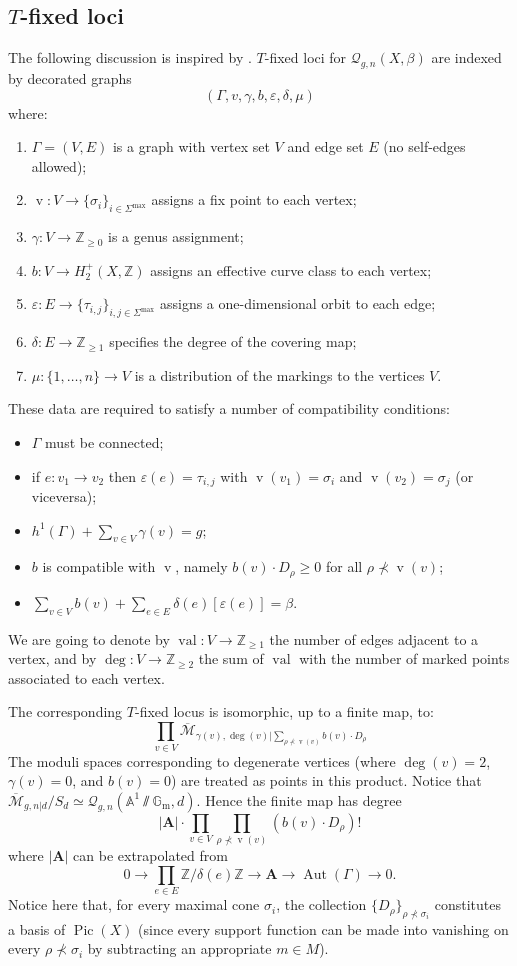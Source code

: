 \documentclass[11pt]{amsart}
\newcommand{\Q}[4]{\mathcal{Q}_{#1,#2}(#3,#4)}
\renewcommand{\to}{\rightarrow}
\newcommand{\Aaff}{\mathbb{A}}
\newcommand{\Pic}{\operatorname{Pic}}
\newcommand{\val}{\operatorname{val}}
\newcommand{\Gm}{\mathbb{G}_{\text{m}}}
\newcommand{\ZZ}{\mathbb{Z}}
\newcommand{\vv}{\operatorname{v}}
\newcommand{\Aut}{\operatorname{Aut}}
\theoremstyle{definition}
\theoremstyle{definition}
\begin{document}
\subsection{$T$-fixed loci}
The following discussion is inspired by \cite[\S 7.3]{MOP}. $T$-fixed loci for $\Q{g}{n}{X}{\beta}$ are indexed by decorated graphs
\[ \left(\Gamma, v, \gamma, b,\varepsilon,\delta,\mu\right) \]
where:
\begin{enumerate}
 \item $\Gamma=(V,E)$ is a graph with vertex set $V$ and edge set $E$ (no self-edges allowed);
 \item $\vv\colon V\to \{\sigma_i\}_{i\in\Sigma^\text{max}}$ assigns a fix point to each vertex;
 \item $\gamma\colon V\to \ZZ_{\geq 0}$ is a genus assignment;
 \item $b\colon V\to H^+_2(X,\ZZ)$ assigns an effective curve class to each vertex;
 \item $\varepsilon\colon E\to \{\tau_{i,j}\}_{i,j\in\Sigma^\text{max}}$ assigns a one-dimensional orbit to each edge;
 \item $\delta\colon E\to \ZZ_{\geq1}$ specifies the degree of the covering map;
 \item $\mu\colon \{1,\ldots,n\}\to V$ is a distribution of the markings to the vertices $V$.
\end{enumerate}
These data are required to satisfy a number of compatibility conditions:
\begin{itemize}
 \item $\Gamma$ must be connected;
 \item if $e\colon v_1\to v_2$ then $\varepsilon(e)=\tau_{i,j}$ with $\vv(v_1)=\sigma_i$ and $\vv(v_2)=\sigma_j$ (or viceversa);
 \item $h^1(\Gamma)+\sum_{v\in V} \gamma(v)=g$;
 \item $b$ is compatible with $\vv$, namely $b(v)\cdot D_\rho\geq 0$ for all $\rho\nprec \vv(v)$; 
 \item $\sum_{v\in V}b(v)+\sum_{e\in E}\delta(e)[\varepsilon(e)]=\beta$.
 \end{itemize}
We are going to denote by $\val\colon V\to\ZZ_{\geq1}$ the number of edges adjacent to a vertex, and by $\deg\colon V\to\ZZ_{\geq2}$ the sum of $\val$ with the number of marked points associated to each vertex.

The corresponding $T$-fixed locus is isomorphic, up to a finite map, to:
\[
 \prod_{v\in V} \overline{\mathcal M}_{\gamma(v),\deg(v)|\sum_{\rho\nprec \vv(v)}b(v)\cdot D_\rho}
\]
The moduli spaces corresponding to degenerate vertices (where $\deg(v)=2$, $\gamma(v)=0$, and $b(v)=0$) are treated as points in this product. Notice that $\overline{\mathcal M}_{g,n|d}/S_d\simeq\Q{g}{n}{\Aaff^1\sslash\Gm}{d}$. Hence the finite map has degree \[|\mathbf A|\cdot\prod_{v\in V}\prod_{\rho\nprec\vv(v)}(b(v)\cdot D_\rho)!\] where $|\mathbf A|$ can be extrapolated from
\[
 0\to\prod_{e\in E}\ZZ/\delta(e)\ZZ\to \mathbf A\to \Aut(\Gamma)\to 0.
\]
Notice here that, for every maximal cone $\sigma_i$, the collection $\{D_\rho\}_{\rho\nprec\sigma_i}$ constitutes a basis of $\Pic(X)$ (since every support function can be made into vanishing on every $\rho\nprec\sigma_i$ by subtracting an appropriate $m\in M$).
\end{document}
